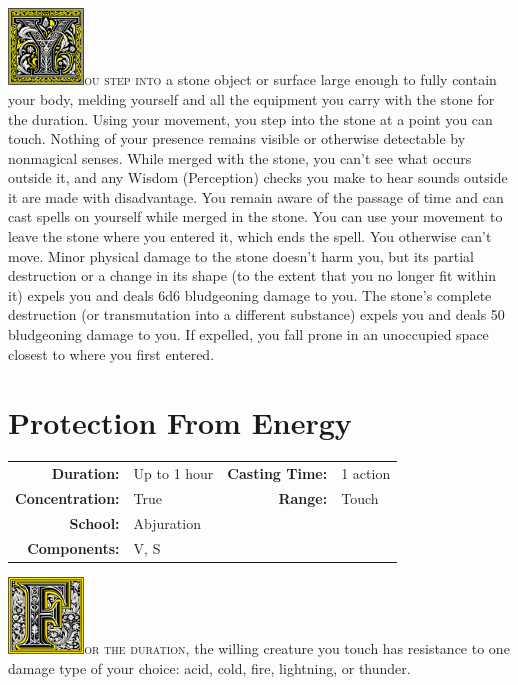 \documentclass[12pt,showtrims]{memoir}
\begin{document}
\vspace{1\baselineskip}\noindent 
\lettrine[lines=4]{\includegraphics[height=58pt]{initials/Y.png}}{ou step into} a stone object or surface large enough to fully contain your body, melding yourself and all the equipment you carry with the stone for the duration. Using your movement, you step into the stone at a point you can touch. Nothing of your presence remains visible or otherwise detectable by nonmagical senses. While merged with the stone, you can't see what occurs outside it, and any Wisdom (Perception) checks you make to hear sounds outside it are made with disadvantage. You remain aware of the passage of time and can cast spells on yourself while merged in the stone. You can use your movement to leave the stone where you entered it, which ends the spell. You otherwise can't move. Minor physical damage to the stone doesn't harm you, but its partial destruction or a change in its shape (to the extent that you no longer fit within it) expels you and deals 6d6 bludgeoning damage to you. The stone's complete destruction (or transmutation into a different substance) expels you and deals 50 bludgeoning damage to you. If expelled, you fall prone in an unoccupied space closest to where you first entered.

\newpage
\section*{Protection From Energy}

{
\small\centering\vspace{-6pt}
\begin{tabular}{rlrl}
\toprule

\textbf{Duration:} & Up to 1 hour &
\textbf{Casting Time:} & 1 action \\
\textbf{Concentration:} & True &
\textbf{Range:} & Touch \\
\textbf{School:} & Abjuration \\
\textbf{Components:} & \multicolumn{3}{p{0.7\textwidth}}{V, S}\\

\bottomrule
\end{tabular}
}

\vspace{1\baselineskip}\noindent 
\lettrine[lines=4]{\includegraphics[height=58pt]{initials/F.png}}{or the duration}, the willing creature you touch has resistance to one damage type of your choice: acid, cold, fire, lightning, or thunder.
\end{document}
